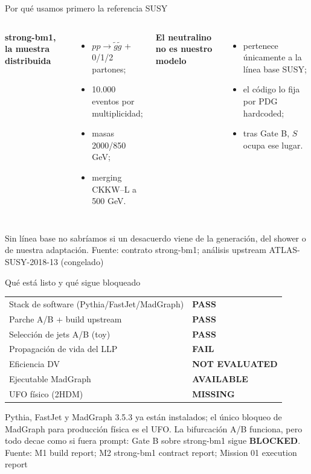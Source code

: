 \documentclass[aspectratio=169,10pt]{beamer}
\newcommand{\source}[1]{\vfill{\tiny\color{gray}Fuente: #1}}
\newcommand{\upcode}{análisis upstream ATLAS-SUSY-2018-13 (congelado)}
\newcommand{\blocked}{\textcolor{stop}{\textbf{BLOCKED}}}
\begin{document}
\begin{frame}{Por qué usamos primero la referencia SUSY}
  \begin{columns}[T]
    \textbf{strong-bm1, la muestra distribuida}
    \begin{itemize}
      \item $pp\to\tilde g\tilde g$ + 0/1/2 partones;
      \item 10.000 eventos por multiplicidad;
      \item masas 2000/850 GeV;
      \item merging CKKW--L a 500 GeV.
    \end{itemize}
    \textbf{El neutralino no es nuestro modelo}
    \begin{itemize}
      \item pertenece únicamente a la línea base SUSY;
      \item el código lo fija por PDG hardcoded;
      \item tras Gate B, $S$ ocupa ese lugar.
    \end{itemize}
  \end{columns}
  \vspace{0.9em}
  \centering
  Sin línea base no sabríamos si un desacuerdo viene de la generación,
  del shower o de nuestra adaptación.
  \source{contrato strong-bm1; \upcode}
\end{frame}

\begin{frame}{Qué está listo y qué sigue bloqueado}
  \vspace{0.3em}
  \begin{tabular}{p{}l}
    \toprule
    Stack de software (Pythia/FastJet/MadGraph) & \textcolor{ok}{\textbf{PASS}}\\
    Parche A/B + build upstream & \textcolor{ok}{\textbf{PASS}}\\
    Selección de jets A/B (toy) & \textcolor{ok}{\textbf{PASS}}\\
    Propagación de vida del LLP & \textcolor{stop}{\textbf{FAIL}}\\
    Eficiencia DV & \textcolor{warn}{\textbf{NOT EVALUATED}}\\
    Ejecutable MadGraph & \textcolor{ok}{\textbf{AVAILABLE}}\\
    UFO físico (2HDM) & \textcolor{stop}{\textbf{MISSING}}\\
    \bottomrule
  \end{tabular}
  \vspace{0.9em}

  Pythia, FastJet y MadGraph 3.5.3 ya están instalados; el único bloqueo de MadGraph
  para producción física es el UFO. La bifurcación A/B funciona, pero todo decae
  como si fuera prompt: Gate B sobre strong-bm1 sigue \blocked.
  \source{M1 build report; M2 strong-bm1 contract report; Mission 01 execution report}
\end{frame}
\end{document}
